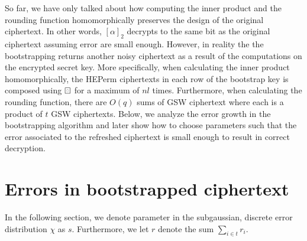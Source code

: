 So far, we have only talked about how computing the inner product and the rounding function homomorphically preserves the design of the original ciphertext. In other words, $[\alpha]_2$ decrypts to the same bit as the original ciphertext assuming error are small enough. However, in reality the the bootstrapping returns another noisy ciphertext as a result of the computations on the encrypted secret key. More specifically, when calculating the inner product homomorphically, the HEPerm ciphertexts in each row of the bootstrap key is composed using $\boxring$ for a maximum of $nl$ times. Furthermore, when calculating the rounding function, there are $O(q)$ sums of GSW ciphertext where each is a product of $t$ GSW ciphertexts. Below, we analyze the error growth in the bootstrapping algorithm and later show how to choose parameters such that the error associated to the refreshed ciphertext is small enough to result in correct decryption.

\section{Errors in bootstrapped ciphertext}
In the following section, we denote parameter in the subgaussian, discrete error distribution $\chi$ as $s$. Furthermore, we let $r$ denote the sum $\sum\limits_{i \in t} r_i$.

